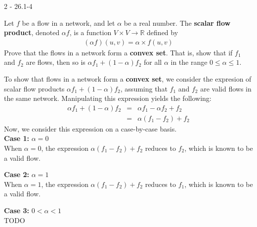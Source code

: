 \documentclass[11pt]{article}
\begin{document}
\begin{prob}{2 - 26.1-4}

Let $f$ be a flow in a network, and let $\alpha$ be a real number. The \textbf{scalar flow product}, denoted $\alpha f$, is a function $V \times V \to \mathbb{R}$ defined by
\begin{eqnarray*}
(\alpha f)(u,v) = \alpha \times f(u,v)
\end{eqnarray*}
Prove that the flows in a network form a \textbf{convex set}. That is, show that if $f_1$ and $f_2$ are flows, then so is $\alpha f_1 + (1 - \alpha)f_2$ for all $\alpha$ in the range $0 \leq \alpha \leq 1$.
\end{prob}
\begin{sol}

To show that flows in a network form a \textbf{convex set}, we consider the expresion of scalar flow products $\alpha f_1 + (1 - \alpha)f_2$, assuming that $f_1$ and $f_2$ are valid flows in the same network. Manipulating this expression yields the following:
\begin{eqnarray*}
\alpha f_1 + (1 - \alpha)f_2 & = & \alpha f_1 - \alpha f_2 + f_2 \\
& = & \alpha(f_1 - f_2) + f_2
\end{eqnarray*}
Now, we consider this expression on a case-by-case basis.\\


\textbf{Case 1:} $\alpha = 0$ \\
When $\alpha = 0$, the expression $\alpha(f_1 - f_2) + f_2$ reduces to $f_2$, which is known to be a valid flow. 

\textbf{Case 2:} $\alpha = 1$ \\
When $\alpha = 1$, the expression $\alpha(f_1 - f_2) + f_2$ reduces to $f_1$, which is known to be a valid flow. 

\textbf{Case 3:} $0 < \alpha  < 1$ \\
TODO
\end{sol}
\end{document}
